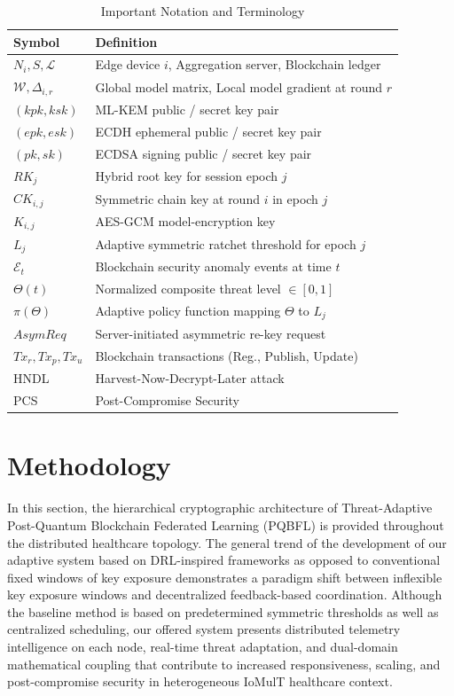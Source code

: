 \documentclass[journal, 10pt, twocolumn]{IEEEtran}
\begin{document}
\begin{table}[htbp]
\centering
\caption{Important Notation and Terminology}
\label{tab:notation}
\begin{tabularx}{\columnwidth}{l X}
\toprule
\textbf{Symbol} & \textbf{Definition} \\
\midrule
$N_i, S, \mathcal{L}$ & Edge device $i$, Aggregation server, Blockchain ledger \\
$\mathcal{W}, \Delta_{i,r}$ & Global model matrix, Local model gradient at round $r$ \\
$(kpk, ksk)$ & ML-KEM public / secret key pair \\
$(epk, esk)$ & ECDH ephemeral public / secret key pair \\
$(pk, sk)$ & ECDSA signing public / secret key pair \\
$RK_j$ & Hybrid root key for session epoch $j$ \\
$CK_{i,j}$ & Symmetric chain key at round $i$ in epoch $j$ \\
$K_{i,j}$ & AES-GCM model-encryption key \\
$L_j$ & Adaptive symmetric ratchet threshold for epoch $j$ \\
$\mathcal{E}_t$ & Blockchain security anomaly events at time $t$ \\
$\Theta(t)$ & Normalized composite threat level $\in [0,1]$ \\
$\pi(\Theta)$ & Adaptive policy function mapping $\Theta$ to $L_j$ \\
$AsymReq$ & Server-initiated asymmetric re-key request \\
$Tx_r, Tx_p, Tx_u$ & Blockchain transactions (Reg., Publish, Update) \\
HNDL & Harvest-Now-Decrypt-Later attack \\
PCS & Post-Compromise Security \\
\bottomrule
\end{tabularx}
\end{table}


\section{Methodology}
In this section, the hierarchical cryptographic architecture of Threat-Adaptive Post-Quantum Blockchain Federated Learning (PQBFL) is provided throughout the distributed healthcare topology. The general trend of the development of our adaptive system based on DRL-inspired frameworks as opposed to conventional fixed windows of key exposure demonstrates a paradigm shift between inflexible key exposure windows and decentralized feedback-based coordination. Although the baseline method is based on predetermined symmetric thresholds as well as centralized scheduling, our offered system presents distributed telemetry intelligence on each node, real-time threat adaptation, and dual-domain mathematical coupling that contribute to increased responsiveness, scaling, and post-compromise security in heterogeneous IoMulT healthcare context.
\end{document}
